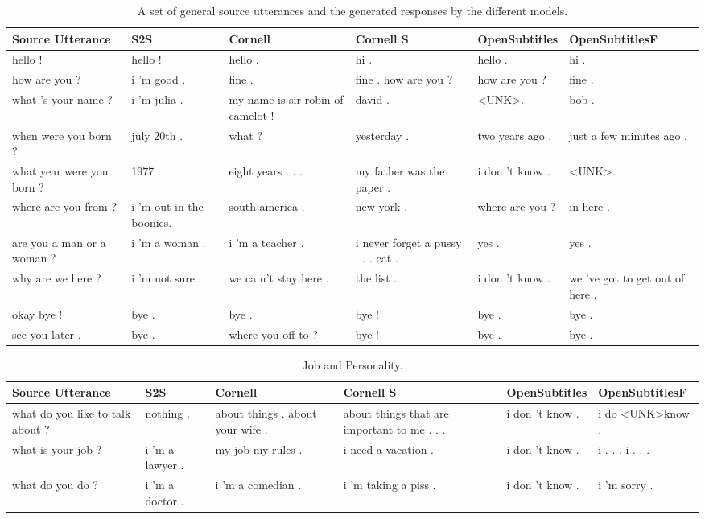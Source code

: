 \documentclass[12pt]{article}
\begin{document}
\begin{table}[H]
	\centering
	\begin{tabular}{|L{2.3cm}|L{2.3cm}|L{2.3cm}|L{2.3cm}|L{2.3cm}|L{2.3cm}|}
		\hline
		\textbf{Source Utterance} & \textbf{S2S} & \textbf{Cornell} & \textbf{Cornell S} & \textbf{OpenSubtitles} & \textbf{OpenSubtitlesF}\\ \hline
		hello ! & hello ! & hello . & hi . & hello . & hi .
		\\ \hline
		how are you ? & i 'm good . & fine . & fine . how are you ? & how are you ? & fine .
		\\ \hline
		what 's your name ? & i ’m julia . & my name is sir robin of camelot !  & david . & \textless UNK\textgreater . & bob . 
		\\ \hline
		when were you born ? & july 20th . & what ? & yesterday . & two years ago . & just a few minutes ago .
		\\ \hline
		what year were you born ? & 1977 . & eight years . . . & my father was the paper . & i don 't know . & \textless UNK\textgreater .
		\\ \hline
		where are you from ? & i ’m out in the boonies. & south america . & new york . & where are you ? & in here .
		\\ \hline
		are you a man or a woman ? & i ’m a woman . & i 'm a teacher .  & i never forget a pussy . . . cat . & yes . & yes .
		\\ \hline
		why are we here ? & i ’m not sure . & we ca n't stay here .  & the list . & i don 't know . & we 've got to get out of here . 
		\\ \hline
		okay bye ! & bye . & bye . & bye ! & bye . & bye .
		\\ \hline
		see you later . & bye . & where you off to ?  & bye ! & bye . & bye .
		\\ \hline
		
	\end{tabular}
	\caption{A set of general source utterances and the generated responses by the different models.}	
	\label{table:basicNCM}
\end{table}
\begin{table}[H]
	\centering
	\begin{tabular}{|L{2.3cm}|L{2.3cm}|L{2.3cm}|L{2.3cm}|L{2.3cm}|L{2.3cm}|}
		\hline
		\textbf{Source Utterance} & \textbf{S2S} & \textbf{Cornell} & \textbf{Cornell S} & \textbf{OpenSubtitles} & \textbf{OpenSubtitlesF}\\ \hline
		what do you like to talk about ? & nothing . & about things . about your wife .  & about things that are important to me . . . & i don 't know . & i do \textless UNK\textgreater know .
		\\ \hline
		what is your job ? & i 'm a lawyer . & my job my rules .  & i need a vacation . & i don 't know . & i . . . i . . .
		\\ \hline
		what do you do ? & i 'm a doctor . & i 'm a comedian .   & i 'm taking a piss . & i don 't know . & i 'm sorry .
		\\ \hline
		
	\end{tabular}
	\caption{Job and Personality.}	
	\label{table:personalityNCM}
\end{table}
\end{document}
